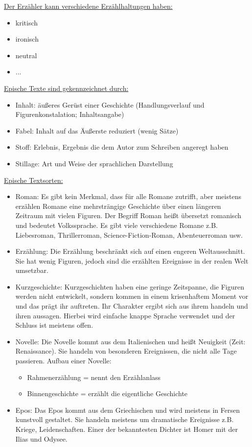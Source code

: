 \documentclass[12pt,a4paper]{article}
\begin{document}
\underline{Der Erzähler kann verschiedene Erzählhaltungen haben:}

	\begin{itemize}
	\item kritisch
	\item ironisch
	\item neutral
	\item ...\\
	\end{itemize}

\underline{Epische Texte sind gekennzeichnet durch:}

	\begin{itemize}
	\item Inhalt: äußeres Gerüst einer Geschichte (Handlungsverlauf und Figurenkonstalation; Inhaltsangabe)
	\item Fabel: Inhalt auf das Äußerste reduziert (wenig Sätze)
	\item Stoff: Erlebnis, Ergebnis die dem Autor zum Schreiben angeregt haben
	\item Stillage: Art und Weise der sprachlichen Darstellung \\
	\end{itemize}	
	
\underline{Epische Textsorten:}

	\begin{itemize}
	\item Roman: Es gibt kein Merkmal, dass für alle Romane zutrifft, aber meistens erzählen Romane eine mehrsträngige Geschichte über
	einen längeren Zeitraum mit vielen Figuren. Der Begriff Roman heißt übersetzt romanisch und bedeutet Volkssprache. Es gibt viele verschiedene
	Romane z.B. Liebesroman, Thrillerroman, Science-Fiction-Roman, Abenteuerroman usw.
	\item Erzählung: Die Erzählung beschränkt sich auf einen engeren Weltausschnitt. Sie hat wenig Figuren, jedoch sind die erzählten Ereignisse in
	der realen Welt umsetzbar.
	\item Kurzgeschichte: Kurzgeschichten haben eine geringe Zeitspanne, die Figuren werden nicht entwickelt, sondern kommen in einem krisenhaftem
	Moment vor und das prägt ihr auftreten. Ihr Charakter ergibt sich aus ihrem handeln und ihren aussagen. Hierbei wird einfache knappe Sprache 
	verwendet und der Schluss ist meistens offen.
	\item Novelle: Die Novelle kommt aus dem Italienischen und heißt Neuigkeit (Zeit: Renaissance). Sie handeln von besonderen Ereignissen, die nicht alle Tage passieren. Aufbau einer Novelle:
		\begin{itemize}
		\item Rahmenerzählung = nennt den Erzählanlass
		\item Binnengeschichte = erzählt die eigentliche Geschichte
		\end{itemize}
	\item Epos: Das Epos kommt aus dem Griechischen und wird meistens in Fersen kunstvoll gestaltet. Sie handeln meistens um dramatische 
	Ereignisse z.B. Kriege, Leidenschaften. Einer der bekanntesten Dichter ist Homer mit der Ilias und Odysee.
	\end{itemize}
	
\end{document}
